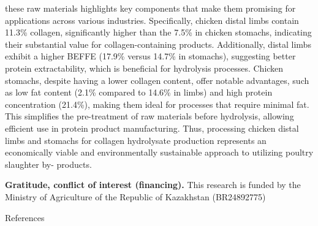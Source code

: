 these raw materials highlights key components that make them promising
for applications across various industries. Specifically, chicken distal
limbs contain 11.3\% collagen, significantly higher than the 7.5\% in
chicken stomachs, indicating their substantial value for
collagen-containing products. Additionally, distal limbs exhibit a
higher BEFFE (17.9\% versus 14.7\% in stomachs), suggesting better
protein extractability, which is beneficial for hydrolysis processes.
Chicken stomachs, despite having a lower collagen content, offer notable
advantages, such as low fat content (2.1\% compared to 14.6\% in limbs)
and high protein concentration (21.4\%), making them ideal for processes
that require minimal fat. This simplifies the pre-treatment of raw
materials before hydrolysis, allowing efficient use in protein product
manufacturing. Thus, processing chicken distal limbs and stomachs for
collagen hydrolysate production represents an economically viable and
environmentally sustainable approach to utilizing poultry slaughter by-
products.

{\bfseries Gratitude, conflict of interest (financing).} This research is
funded by the Ministry of Agriculture of the Republic of Kazakhstan
(BR24892775)

References


